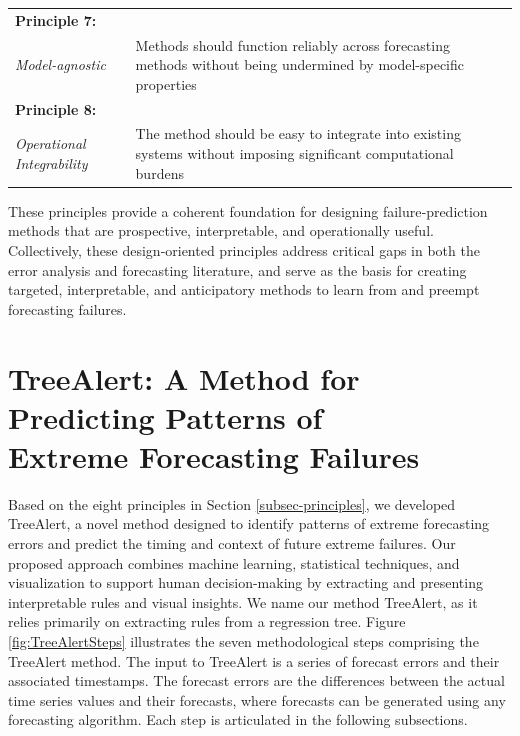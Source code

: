 \documentclass[12pt]{article}
\let\oldtable\table
\let\endoldtable\endtable
\renewenvironment{table}
  {\oldtable\spacingset{1}}
  {\endoldtable}
\begin{document}
\begin{table}
\begin{tabular}{|m{2.7cm}|m{12.5cm}|}
\hline
\centering\textbf{Principle 7:} \\ \centering\textit{Model-agnostic} & Methods should function reliably across forecasting methods without being undermined by model-specific properties \\
\hline
\centering\textbf{Principle 8:} \\ \centering\textit{Operational Integrability} & The method should be easy to integrate into existing  systems without \newline imposing significant computational burdens \\
\hline
\end{tabular}
\label{tab:principles}
\end{table}

These principles provide a coherent foundation for designing failure‑prediction methods that are prospective, interpretable, and operationally useful. Collectively, these design‑oriented principles address critical gaps in both the error analysis and forecasting literature, and serve as the basis for creating targeted, interpretable, and anticipatory methods to learn from and preempt forecasting failures. %

\section{TreeAlert: A Method for Predicting Patterns of\\Extreme Forecasting Failures}
\label{sec:treealert_method}

Based on the eight principles in Section \ref{subsec-principles}, we developed TreeAlert, a novel method designed to identify patterns of extreme forecasting errors and predict the timing and context of future extreme failures. Our proposed approach combines machine learning, statistical techniques, and visualization to support human decision-making by extracting and presenting interpretable rules and visual insights. We name our method TreeAlert, as it relies primarily on extracting rules from a regression tree. Figure \ref{fig:TreeAlertSteps} illustrates the seven methodological steps comprising the TreeAlert method. The input to TreeAlert is a series of forecast errors and their associated timestamps. The forecast errors are the differences between the actual time series values and their forecasts, where forecasts can be generated using any forecasting algorithm. Each step is articulated in the following subsections.
\end{document}

